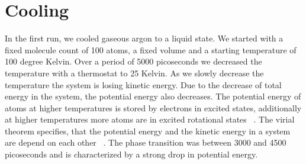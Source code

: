 \documentclass[10pt, a4paper, oneside, twocolumn]{report}
\begin{document}
\section{Cooling}

In the first run, we cooled gaseous argon to a liquid state. We started with a fixed molecule count of 100 atoms, a fixed volume and a starting temperature of 100 degree Kelvin. Over a period of 5000 picoseconds we decreased the temperature with a thermostat to 25 Kelvin. As we slowly decrease the temperature the system is losing kinetic energy. Due to the decrease of total energy in the system, the potential energy also decreases.
The potential energy of atoms at higher temperatures is stored by electrons in excited states, additionally at higher temperatures more atoms are in excited rotational states ~\cite{chemguide}. The virial theorem specifies, that the potential energy and the kinetic energy in a system are depend on each other ~\cite{cosmos-indirekt}. The phase transition was between 3000 and 4500 picoseconds and is characterized by a strong drop in potential energy. 
\end{document}

